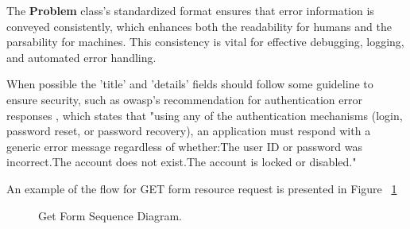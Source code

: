 The \textbf{Problem} class's standardized format ensures that error information is conveyed consistently, which enhances both the readability for humans and the parsability for machines. This consistency is vital for effective debugging, logging, and automated error handling.

When possible the 'title' and 'details' fields should follow some guideline to ensure security, such as owasp's recommendation for authentication error responses \cite{owasp_authentication}, which states that "using any of the authentication mechanisms (login, password reset, or password recovery), an application must respond with a generic error message regardless of whether:The user ID or password was incorrect.The account does not exist.The account is locked or disabled."

An example of the flow for GET form resource request is presented in Figure ~\ref{fig:getForm_Sequence_Diagram}

\begin{figure}[H]
	\begin{center}
	\end{center}
	\caption{Get Form Sequence Diagram.}\label{fig:getForm_Sequence_Diagram}
\end{figure}








